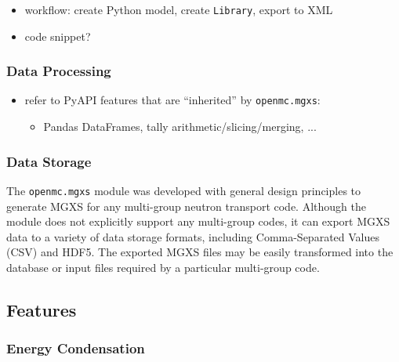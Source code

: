 \begin{itemize}[noitemsep]
\item workflow: create Python model, create \texttt{Library}, export to XML
\item code snippet?
\end{itemize}

\subsubsection{Data Processing}
\label{subsec:data-processing}

\begin{itemize}[noitemsep]
\item refer to PyAPI features that are ``inherited'' by \texttt{openmc.mgxs}:
  \begin{itemize}[noitemsep]
  \item Pandas DataFrames, tally arithmetic/slicing/merging, ...
  \end{itemize}
\end{itemize}

\subsubsection{Data Storage}
\label{subsec:data-storage}

The \texttt{openmc.mgxs} module was developed with general design principles to generate MGXS for any multi-group neutron transport code. Although the module does not explicitly support any multi-group codes, it can export MGXS data to a variety of data storage formats, including Comma-Separated Values (CSV) and HDF5. The exported MGXS files may be easily transformed into the database or input files required by a particular multi-group code.

\subsection{Features}
\label{sec:features}


\subsubsection{Energy Condensation}
\label{subsec:energy-condense}

